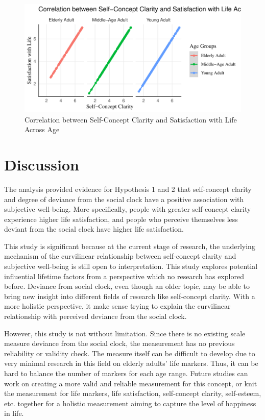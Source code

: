 \documentclass[
  man,floatsintext]{apa6}
\begin{document}
\begin{figure}
\centering
\includegraphics{Exploring-the-Role-of-Deviance-on-Self-Concept-Clarity-Across-the-Lifespan-_files/figure-latex/SCCtoSWL-1.pdf}
\caption{\label{fig:SCCtoSWL}Correlation between Self-Concept Clarity and Satisfaction with Life Across Age}
\end{figure}

\hypertarget{discussion}{%
\section{Discussion}\label{discussion}}

The analysis provided evidence for Hypothesis 1 and 2 that self-concept clarity and degree of deviance from the social clock have a positive association with subjective well-being. More specifically, people with greater self-concept clarity experience higher life satisfaction, and people who perceive themselves less deviant from the social clock have higher life satisfaction.

This study is significant because at the current stage of research, the underlying mechanism of the curvilinear relationship between self-concept clarity and subjective well-being is still open to interpretation. This study explores potential influential lifetime factors from a perspective which no research has explored before. Deviance from social clock, even though an older topic, may be able to bring new insight into different fields of research like self-concept clarity. With a more holistic perspective, it make sense trying to explain the curvilinear relationship with perceived deviance from the social clock.

However, this study is not without limitation. Since there is no existing scale measure deviance from the social clock, the measurement has no previous reliability or validity check. The measure itself can be difficult to develop due to very minimal research in this field on elderly adults' life markers. Thus, it can be hard to balance the number of markers for each age range.
Future studies can work on creating a more valid and reliable measurement for this concept, or knit the measurement for life markers, life satisfaction, self-concept clarity, self-esteem, etc. together for a holistic measurement aiming to capture the level of happiness in life.
\end{document}
